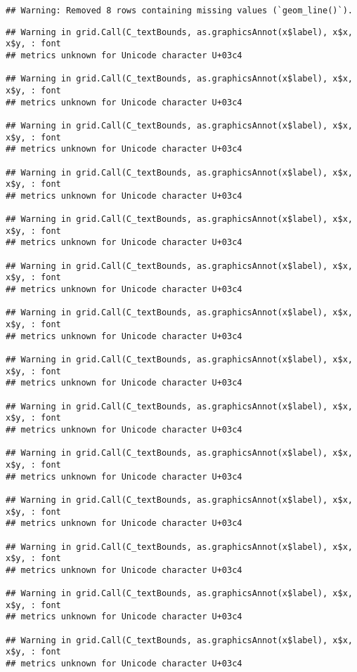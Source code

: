 \documentclass[
]{article}
\begin{document}
\begin{verbatim}
## Warning: Removed 8 rows containing missing values (`geom_line()`).
\end{verbatim}

\begin{verbatim}
## Warning in grid.Call(C_textBounds, as.graphicsAnnot(x$label), x$x, x$y, : font
## metrics unknown for Unicode character U+03c4

## Warning in grid.Call(C_textBounds, as.graphicsAnnot(x$label), x$x, x$y, : font
## metrics unknown for Unicode character U+03c4

## Warning in grid.Call(C_textBounds, as.graphicsAnnot(x$label), x$x, x$y, : font
## metrics unknown for Unicode character U+03c4

## Warning in grid.Call(C_textBounds, as.graphicsAnnot(x$label), x$x, x$y, : font
## metrics unknown for Unicode character U+03c4

## Warning in grid.Call(C_textBounds, as.graphicsAnnot(x$label), x$x, x$y, : font
## metrics unknown for Unicode character U+03c4

## Warning in grid.Call(C_textBounds, as.graphicsAnnot(x$label), x$x, x$y, : font
## metrics unknown for Unicode character U+03c4

## Warning in grid.Call(C_textBounds, as.graphicsAnnot(x$label), x$x, x$y, : font
## metrics unknown for Unicode character U+03c4

## Warning in grid.Call(C_textBounds, as.graphicsAnnot(x$label), x$x, x$y, : font
## metrics unknown for Unicode character U+03c4

## Warning in grid.Call(C_textBounds, as.graphicsAnnot(x$label), x$x, x$y, : font
## metrics unknown for Unicode character U+03c4

## Warning in grid.Call(C_textBounds, as.graphicsAnnot(x$label), x$x, x$y, : font
## metrics unknown for Unicode character U+03c4

## Warning in grid.Call(C_textBounds, as.graphicsAnnot(x$label), x$x, x$y, : font
## metrics unknown for Unicode character U+03c4

## Warning in grid.Call(C_textBounds, as.graphicsAnnot(x$label), x$x, x$y, : font
## metrics unknown for Unicode character U+03c4

## Warning in grid.Call(C_textBounds, as.graphicsAnnot(x$label), x$x, x$y, : font
## metrics unknown for Unicode character U+03c4

## Warning in grid.Call(C_textBounds, as.graphicsAnnot(x$label), x$x, x$y, : font
## metrics unknown for Unicode character U+03c4


\end{verbatim}
\end{document}
